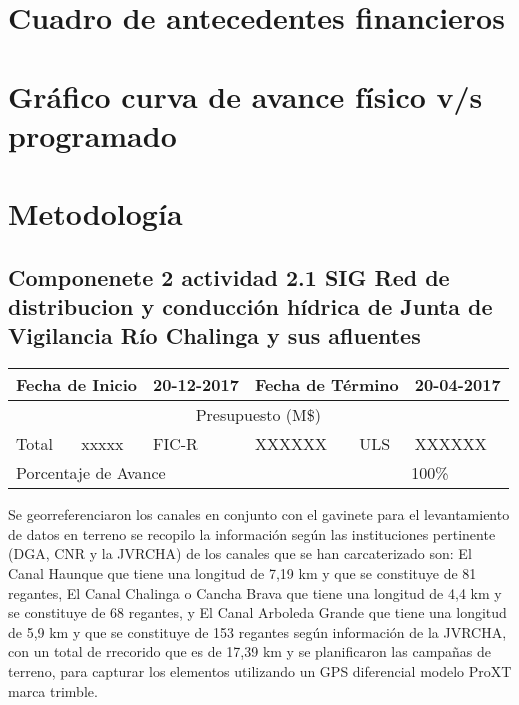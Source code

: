 \documentclass[]{article}
\begin{document}
\clearpage
\section{Cuadro de antecedentes financieros}

\clearpage
\section{Gráfico curva de avance físico v/s programado}

\clearpage
\section{Metodología}

\subsection{Componenete 2 actividad  2.1 SIG Red de distribucion y conducción hídrica de Junta de Vigilancia Río Chalinga y sus afluentes}

\begin{table}[!htb]
\centering
\begin{tabular}{|p{2cm}|p{2cm}|p{2cm}|p{2cm}|p{2cm}|p{2cm}|}
    \hline
    \multicolumn{2}{|l|}{Fecha de Inicio} & 20-12-2017 & \multicolumn{2}{l|}{Fecha de Término} & 20-04-2017\\
    \hline
    \multicolumn{6}{|c|}{Presupuesto (M\$)}\\
    \hline
    Total & xxxxx & FIC-R & XXXXXX & ULS & XXXXXX\\
    \hline
    \multicolumn{4}{|l|}{Porcentaje de Avance} & \multicolumn{2}{c|}{100\%}\\
    \hline
\end{tabular}
\end{table}

Se georreferenciaron  los canales en conjunto con el gavinete para el levantamiento de datos en terreno   se recopilo la información según las instituciones pertinente (DGA, CNR y la JVRCHA) de  los canales  que se han carcaterizado son: El Canal Haunque que tiene una longitud de 7,19 km y que se constituye de 81 regantes, El Canal Chalinga o Cancha Brava que tiene una longitud de  4,4 km y se constituye de 68 regantes, y  El  Canal Arboleda Grande que tiene una longitud de 5,9 km y que se constituye de 153 regantes según información de la JVRCHA, con un total de rrecorido que es de 17,39 km y  se planificaron las campañas de terreno, para capturar los elementos utilizando un GPS diferencial modelo ProXT marca trimble.
\end{document}
